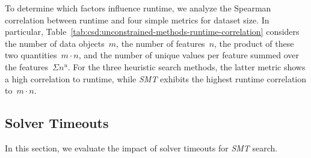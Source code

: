 \documentclass{article}
\theoremstyle{definition}
\begin{document}
To determine which factors influence runtime, we analyze the Spearman correlation between runtime and four simple metrics for dataset size.
In particular, Table~\ref{tab:csd:unconstrained-methods-runtime-correlation} considers the number of data objects~$m$, the number of features~$n$, the product of these two quantities~$m \cdot n$, and the number of unique values per feature summed over the features~$\Sigma n^u$.
For the three heuristic search methods, the latter metric shows a high correlation to runtime, while \emph{SMT} exhibits the highest runtime correlation to~$m \cdot n$.

\subsection{Solver Timeouts}
\label{sec:csd:evaluation:timeouts}

In this section, we evaluate the impact of solver timeouts for \emph{SMT} search.
\end{document}
